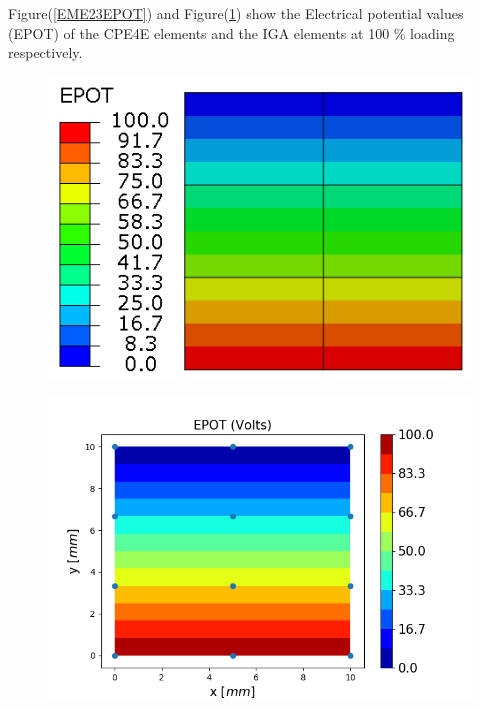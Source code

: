 \documentclass[11pt]{article}
\begin{document}
Figure(\ref{EME23EPOT}) and Figure(\ref{EME23EPOT_IGA}) show the Electrical potential values (EPOT) of the CPE4E elements and the IGA elements at 100 \% loading respectively. \\
\begin{figure}[H]
	\centering
	\begin{minipage}{.5\textwidth}
		\centering
		\includegraphics[width=1\linewidth]{EME23EPOT.png}
		\label{EME23EPOT}
	\end{minipage}%
	\begin{minipage}{.6\textwidth}
		\centering
		\includegraphics[width=1\linewidth]{EME23EPOT_IGA.png}
		\label{EME23EPOT_IGA}
	\end{minipage}
\end{figure}
\end{document}
